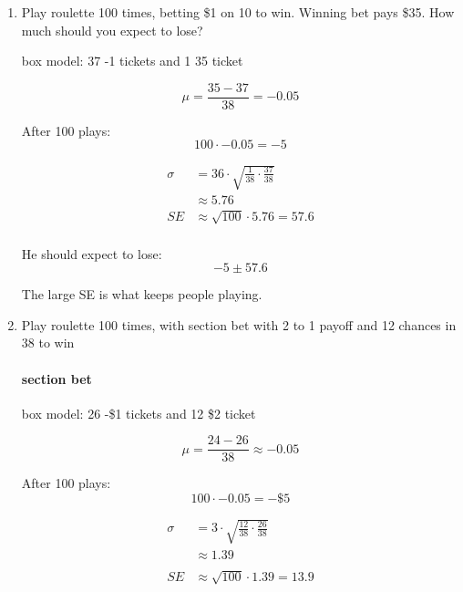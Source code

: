 \documentclass[portrait]{exam}
\begin{document}
  \begin{enumerate}
    \item Play roulette 100 times, betting \$1 on 10 to win. Winning bet
      pays \$35. How much should you expect to lose?
      \begin{solution}
        box model: 37 -1 tickets and 1 35 ticket

        \[
          \mu = \frac{35 - 37}{38} = -0.05
        \]

        After 100 plays:
        \[
          100 \cdot -0.05 = -5
        \]

        \begin{align*}
          \sigma & = 36 \cdot \sqrt{\frac{1}{38} \cdot \frac{37}{38}} \\
                 & \approx 5.76 \\
          SE     & \approx \sqrt{100} \cdot 5.76 = 57.6 \\
        \end{align*}

        He should expect to lose:
        \[
          -5 \pm 57.6
        \]

        The large SE is what keeps people playing.

      \end{solution}

    \item Play roulette 100 times, with section bet with 2 to 1 payoff and 12
      chances in 38 to win

      \begin{solution}
        \paragraph{section bet}
        box model: 26 -\$1 tickets and 12 \$2 ticket

        \[
          \mu = \frac{24 - 26}{38} \approx -0.05
        \]

        After 100 plays:
        \[
          100 \cdot -0.05 = -\$5
        \]

        \begin{align*}
          \sigma &= 3 \cdot \sqrt{\frac{12}{38} \cdot \frac{26}{38}} \\
          & \approx 1.39 \\
          \\
          SE &\approx \sqrt{100} \cdot 1.39 = 13.9 \\
        \end{align*}


\end{solution}
\end{enumerate}
\end{document}
